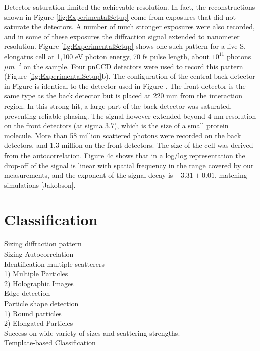Detector saturation limited the achievable resolution.  In fact, the reconstructions shown in Figure \ref{fig:ExperimentalSetup} come from exposures that did not saturate the detectors. A number of much stronger exposures were also recorded, and in some of these exposures the diffraction signal extended to nanometer resolution. Figure \ref{fig:ExperimentalSetup} shows one such pattern for a live S. elongatus cell at 1,100 eV photon energy, 70 fs pulse length, about $10^11$ photons $\mu m^{-2}$ on the sample. Four pnCCD detectors were used to record this pattern (Figure \ref{fig:ExperimentalSetup}b). The configuration of the central back detector in Figure  is identical to the detector used in Figure . The front detector is the same type as the back detector but is placed at 220 mm from the interaction region. In this strong hit, a large part of the back detector was saturated, preventing reliable phasing. The signal however extended beyond 4 nm resolution on the front detectors (at sigma 3.7), which is the size of a small protein molecule. More than 58 million scattered photons were recorded on the back detectors, and 1.3 million on the front detectors. The size of the cell was derived from the autocorrelation. Figure 4c shows that in a log/log representation the drop-off of the signal is linear with spatial frequency in the range covered by our measurements, and the exponent of the signal decay is $-3.31\pm0.01$, matching simulations [Jakobson].

 

\section{Classification}

Sizing diffraction pattern
\\
Sizing Autocorrelation
\\
Identification multiple scatterers
\\	1) Multiple Particles
\\	2) Holographic Images
\\
Edge detection
\\
Particle shape detection
\\	1) Round particles
\\	2) Elongated Particles
\\
Success on wide variety of sizes and scattering strengths.
\\
Template-based Classification
\\

